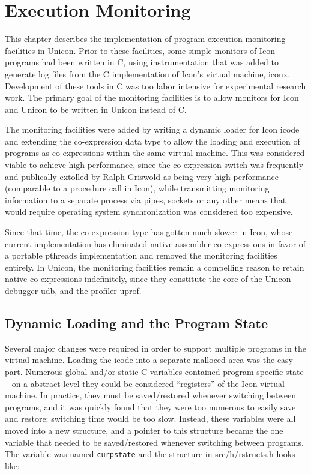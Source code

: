 \chapter{Execution Monitoring}

This chapter describes the implementation of program execution
monitoring facilities in Unicon. Prior to these facilities, some
simple monitors of Icon programs had been written in C, using
instrumentation that was added to generate log files from the C
implementation of Icon's virtual machine, iconx. Development of these
tools in C was too labor intensive for experimental research work. The
primary goal of the monitoring facilities is to allow monitors for
Icon and Unicon to be written in Unicon instead of C.

The monitoring facilities were added by writing a dynamic loader for
Icon icode and extending the co-expression data type to allow the
loading and execution of programs as co-expressions within the same
virtual machine. This was considered viable to achieve high
performance, since the co-expression switch was frequently and
publically extolled by Ralph Griswold as being very high performance
(comparable to a procedure call in Icon), while transmitting
monitoring information to a separate process via pipes, sockets or
any other means that would require operating system synchronization
was considered too expensive.

Since that time, the co-expression type has gotten much slower in
Icon, whose current implementation has eliminated native assembler
co-expressions in favor of a portable pthreads implementation and
removed the monitoring facilities entirely. In Unicon, the monitoring
facilities remain a compelling reason to retain native co-expressions
indefinitely, since they constitute the core of the Unicon debugger
udb, and the profiler uprof.

\section{Dynamic Loading and the Program State}

Several major changes were required in order to support multiple
programs in the virtual machine. Loading the icode into a separate
malloced area was the easy part.  Numerous global and/or static C
variables contained program-specific state -- on a abstract level
they could be considered ``registers'' of the Icon virtual machine.
In practice, they must be saved/restored whenever switching between
programs, and it was quickly found that they were too numerous to
easily save and restore: switching time would be too slow. Instead,
these variables were all moved into a new structure, and a pointer
to this structure became the one variable that needed to be
saved/restored whenever switching between programs. The variable
was named {\tt curpstate} and the structure in src/h/rstructs.h
looks like:

